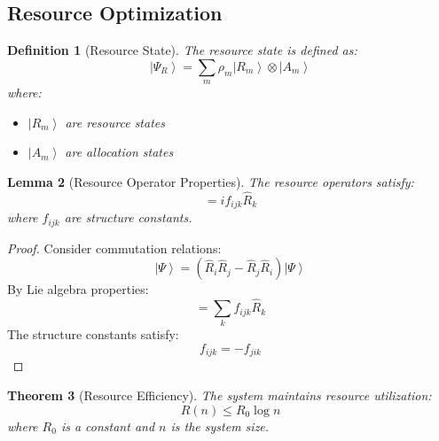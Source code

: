 \documentclass[12pt]{article}
\newcommand{\ket}[1]{\left|#1\right\rangle}
\newcommand{\op}[1]{\hat{#1}}
\newtheorem{theorem}{Theorem}[section]
\newtheorem{lemma}[theorem]{Lemma}
\newtheorem{definition}[theorem]{Definition}
\begin{document}
\subsection{Resource Optimization}
\begin{definition}[Resource State]
The resource state is defined as:
\begin{equation}
\ket{\Psi_R} = \sum_m \rho_m\ket{R_m} \otimes \ket{A_m}
\end{equation}
where:
\begin{itemize}
\item $\ket{R_m}$ are resource states
\item $\ket{A_m}$ are allocation states
\end{itemize}
\end{definition}
\begin{lemma}[Resource Operator Properties]
The resource operators satisfy:
\begin{equation}
[\op{R}_i,\op{R}_j] = if_{ijk}\op{R}_k
\end{equation}
where $f_{ijk}$ are structure constants.
\end{lemma}
\begin{proof}
Consider commutation relations:
\begin{equation}
[\op{R}_i,\op{R}_j]\ket{\Psi} = (\op{R}_i\op{R}_j - \op{R}_j\op{R}_i)\ket{\Psi}
\end{equation}
By Lie algebra properties:
\begin{equation}
[\op{R}_i,\op{R}_j] = \sum_k f_{ijk}\op{R}_k
\end{equation}
The structure constants satisfy:
\begin{equation}
f_{ijk} = -f_{jik}
\end{equation}
\end{proof}
\begin{theorem}[Resource Efficiency]
The system maintains resource utilization:
\begin{equation}
R(n) \leq R_0\log n
\end{equation}
where $R_0$ is a constant and $n$ is the system size.
\end{theorem}
\end{document}
